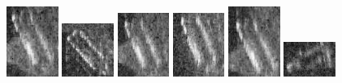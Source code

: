 \begin{figure}
    \includegraphics[width=0.15\textwidth]{chapters/images/dataset/all-class-images/bottle/bottle-402.jpg}
    \includegraphics[width=0.15\textwidth]{chapters/images/dataset/all-class-images/bottle/bottle-149.jpg}
    \includegraphics[width=0.15\textwidth]{chapters/images/dataset/all-class-images/bottle/bottle-329.jpg}
    \includegraphics[width=0.15\textwidth]{chapters/images/dataset/all-class-images/bottle/bottle-230.jpg}
    \includegraphics[width=0.15\textwidth]{chapters/images/dataset/all-class-images/bottle/bottle-418.jpg}
    \includegraphics[width=0.15\textwidth]{chapters/images/dataset/all-class-images/bottle/bottle-135.jpg}
    

\end{figure}
